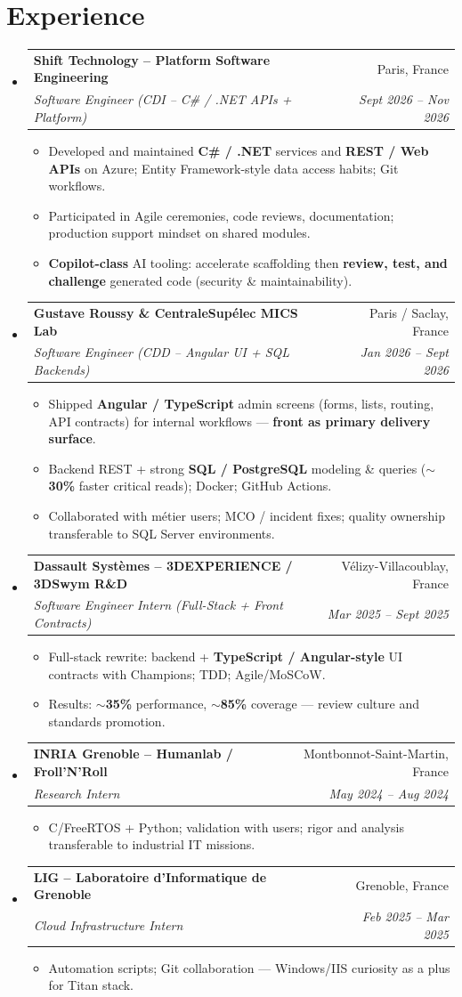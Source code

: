 \documentclass[letterpaper,10.5pt]{article}
\makeatletter
\newcommand{\resumeItem}[1]{\item\small{#1 \vspace{-1.5pt}}}
\newcommand{\resumeSubheading}[4]{\vspace{-1pt}\item\begin{tabular*}{0.97\textwidth}[t]{l@{\extracolsep{\fill}}r}\textbf{#1} & #2 \\\textit{\small#3} & \textit{\small #4} \\\end{tabular*}\vspace{-5pt}}
\newcommand{\resumeSubHeadingListStart}{\begin{itemize}[leftmargin=0.15in, label={}]}
\newcommand{\resumeSubHeadingListEnd}{\end{itemize}}
\newcommand{\resumeItemListStart}{\begin{itemize}[leftmargin=0.18in]}
\newcommand{\resumeItemListEnd}{\end{itemize}\vspace{-3pt}}
\makeatother
\begin{document}
\section{Experience}
\resumeSubHeadingListStart
  \resumeSubheading
    {Shift Technology -- Platform Software Engineering}{Paris, France}
    {Software Engineer (CDI -- C\# / .NET APIs + Platform)}{Sept 2026 -- Nov 2026}
    \resumeItemListStart
      \resumeItem{Developed and maintained \textbf{C\# / .NET} services and \textbf{REST / Web APIs} on Azure; Entity Framework-style data access habits; Git workflows.}
      \resumeItem{Participated in Agile ceremonies, code reviews, documentation; production support mindset on shared modules.}
      \resumeItem{\textbf{Copilot-class} AI tooling: accelerate scaffolding then \textbf{review, test, and challenge} generated code (security \& maintainability).}
    \resumeItemListEnd
  \resumeSubheading
    {Gustave Roussy \& CentraleSup\'elec MICS Lab}{Paris / Saclay, France}
    {Software Engineer (CDD -- Angular UI + SQL Backends)}{Jan 2026 -- Sept 2026}
    \resumeItemListStart
      \resumeItem{Shipped \textbf{Angular / TypeScript} admin screens (forms, lists, routing, API contracts) for internal workflows --- \textbf{front as primary delivery surface}.}
      \resumeItem{Backend REST + strong \textbf{SQL / PostgreSQL} modeling \& queries (\textbf{$\sim$30\%} faster critical reads); Docker; GitHub Actions.}
      \resumeItem{Collaborated with m\'etier users; MCO / incident fixes; quality ownership transferable to SQL Server environments.}
    \resumeItemListEnd
  \resumeSubheading
    {Dassault Syst\`emes -- 3DEXPERIENCE / 3DSwym R\&D}{V\'elizy-Villacoublay, France}
    {Software Engineer Intern (Full-Stack + Front Contracts)}{Mar 2025 -- Sept 2025}
    \resumeItemListStart
      \resumeItem{Full-stack rewrite: backend + \textbf{TypeScript / Angular-style} UI contracts with Champions; TDD; Agile/MoSCoW.}
      \resumeItem{Results: \textbf{$\sim$35\%} performance, \textbf{$\sim$85\%} coverage --- review culture and standards promotion.}
    \resumeItemListEnd
  \resumeSubheading
    {INRIA Grenoble -- Humanlab / Froll'N'Roll}{Montbonnot-Saint-Martin, France}
    {Research Intern}{May 2024 -- Aug 2024}
    \resumeItemListStart
      \resumeItem{C/FreeRTOS + Python; validation with users; rigor and analysis transferable to industrial IT missions.}
    \resumeItemListEnd
  \resumeSubheading
    {LIG -- Laboratoire d'Informatique de Grenoble}{Grenoble, France}
    {Cloud Infrastructure Intern}{Feb 2025 -- Mar 2025}
    \resumeItemListStart
      \resumeItem{Automation scripts; Git collaboration --- Windows/IIS curiosity as a plus for Titan stack.}
    \resumeItemListEnd
\resumeSubHeadingListEnd
\end{document}
